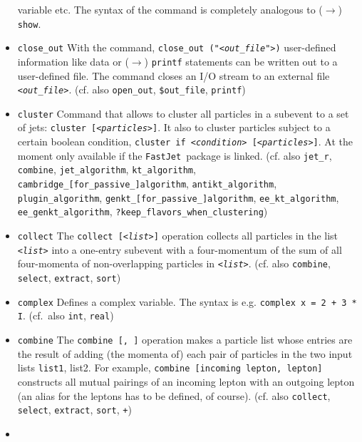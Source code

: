 \documentclass[12pt]{book}
\newcommand{\ttt}[1]{\texttt{#1}}
\newcommand{\fastjet}{\ttt{FastJet}}
\begin{document}
\begin{itemize}
variable etc. The syntax of the command is completely analogous to
($\to$) \ttt{show}.
\item
\ttt{close\_out} \newline
With the command, \ttt{close\_out ("{\em <out\_file">})} user-defined
information like data or ($\to$) \ttt{printf} statements can be
written out to a user-defined file. The command closes an I/O stream to
an external file \ttt{{\em <out\_file>}}. (cf. also \ttt{open\_out},
\ttt{\$out\_file}, \ttt{printf})
\item
\ttt{cluster} \newline
Command that allows to cluster all particles in a subevent to a set of
jets: \ttt{cluster [{\em<particles>}]}. It also to cluster particles
subject to a certain boolean condition, \ttt{cluster if
  {\em<condition>} [{\em<particles>}]}. At the moment only available
if the \fastjet\ package is linked.
(cf. also \ttt{jet\_r}, \ttt{combine}, \ttt{jet\_algorithm},
\ttt{kt\_algorithm}, \newline \ttt{cambridge\_[for\_passive\_]algorithm},
\ttt{antikt\_algorithm}, \ttt{plugin\_algorithm}, \newline
\ttt{genkt\_[for\_passive\_]algorithm},
\ttt{ee\_kt\_algorithm}, \ttt{ee\_genkt\_algorithm},
\ttt{?keep\_flavors\_when\_clustering})
\item
\ttt{collect} \newline
The \ttt{collect [{\em <list>}]} operation collects all particles in
the list \ttt{{\em <list>}} into a one-entry subevent with a
four-momentum of the sum of all four-momenta of non-overlapping
particles in \ttt{{\em <list>}}. (cf. also \ttt{combine},
\ttt{select}, \ttt{extract}, \ttt{sort})
\item
\ttt{complex} \newline
Defines a complex variable. The syntax is e.g. \ttt{complex x = 2 + 3
  * I}. (cf.~also \ttt{int}, \ttt{real})
\item
\ttt{combine} \newline
The \ttt{combine [{\em <list1>}, {\em <list2>}]} operation makes a particle list
whose entries are the result of adding (the momenta of) each pair of
particles in the two input lists \ttt{list1}, {list2}. For example,
\ttt{combine [incoming lepton, lepton]} constructs all mutual pairings
of an incoming lepton with an outgoing lepton (an alias for the
leptons has to be defined, of course). (cf. also \ttt{collect},
\ttt{select}, \ttt{extract}, \ttt{sort}, \ttt{+})
\item

\end{itemize}
\end{document}
